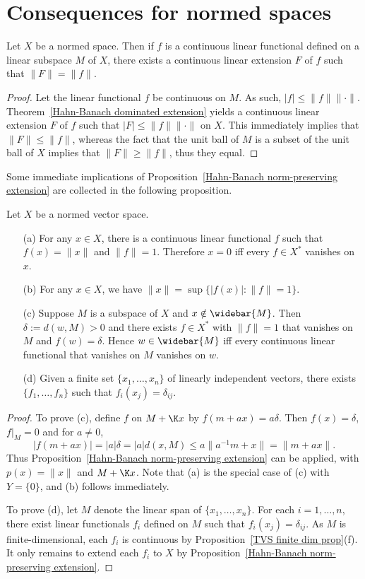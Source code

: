 \section{Consequences for normed spaces}
\begin{proposition}\label{Hahn-Banach norm-preserving extension}
Let $X$ be a normed space. Then if $f$ is a continuous linear functional defined on a linear subspace $M$ of $X$, there exists a continuous linear extension $F$ of $f$ such that $\|F\|=\|f\|$.
\end{proposition}
\begin{proof}
Let the linear functional $f$ be continuous on $M$. As such, $|f|\leq\|f\|\|\cdot\|$. Theorem~\ref{Hahn-Banach dominated extension} yields a continuous linear extension $F$ of $f$ such that $|F|\leq\|f\|\|\cdot\|$ on $X$. This immediately implies that $\|F\|\leq\|f\|$, whereas the fact that the unit ball of $M$ is a subset of the unit ball of $X$ implies that $\|F\|\geq\|f\|$, thus they equal.
\end{proof}
Some immediate implications of Proposition~\ref{Hahn-Banach norm-preserving extension} are collected in the following proposition.
\begin{proposition}\label{NVS linear functional prop}
Let $X$ be a normed vector space.
\begin{itemize}
\item[(a)] For any $x\in X$, there is a continuous linear functional $f$ such that $f(x)=\|x\|$ and $\|f\|=1$. Therefore $x=0$ iff every $f\in X^*$ vanishes on $x$.
\item[(b)] For any $x\in X$, we have $\|x\|=\sup\{|f(x)|:\|f\|=1\}$.
\item[(c)] Suppose $M$ is a subspace of $X$ and $x\notin\widebar{M}$. Then $\delta:=d(w,M)>0$ and there exists $f\in X^*$ with $\|f\|=1$ that vanishes on $M$ and $f(w)=\delta$. Hence $w\in\widebar{M}$ iff every continuous linear functional that vanishes on $M$ vanishes on $w$.
\item[(d)] Given a finite set $\{x_1,\dots,x_n\}$ of linearly independent vectors, there exists $\{f_1,\dots,f_n\}$ such that $f_i(x_j)=\delta_{ij}$.
\end{itemize}
\end{proposition}
\begin{proof}
To prove (c), define $f$ on $M+\K x$ by $f(m+ax)=a\delta$. Then $f(x)=\delta$, $f|_{M}=0$ and for $a\neq 0$,
\[|f(m+ax)|=|a|\delta=|a|d(x,M)\leq a\|a^{-1}m+x\|=\|m+ax\|.\]
Thus Proposition~\ref{Hahn-Banach norm-preserving extension} can be applied, with $p(x)=\|x\|$ and $M+\K x$. Note that (a) is the special case of (c) with $Y=\{0\}$, and (b) follows immediately.\par
To prove (d), let $M$ denote the linear span of $\{x_1,\dots,x_n\}$. For each $i=1,\dots,n$, there exist linear functionals $f_i$ defined on $M$ such that $f_i(x_j)=\delta_{ij}$. As $M$ is finite-dimensional, each $f_i$ is continuous by Proposition~\ref{TVS finite dim prop}(f). It only remains to extend each $f_i$ to $X$ by Proposition~\ref{Hahn-Banach norm-preserving extension}.
\end{proof}
